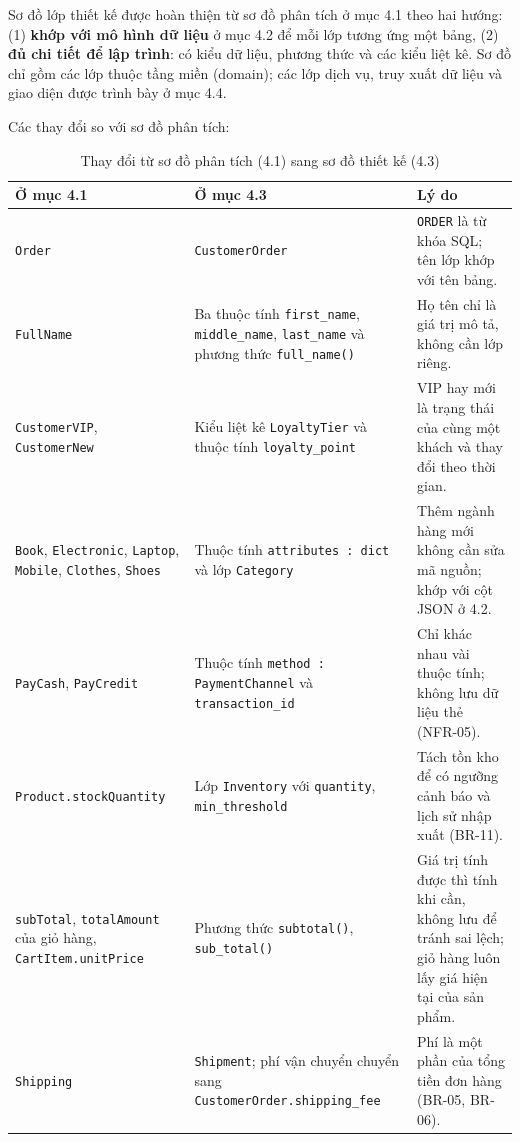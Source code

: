 \documentclass[12pt,a4paper,oneside]{report}
\begin{document}
Sơ đồ lớp thiết kế được hoàn thiện từ sơ đồ phân tích ở mục 4.1 theo hai hướng: (1) \textbf{khớp với mô hình dữ liệu} ở mục 4.2 để mỗi lớp tương ứng một bảng, (2) \textbf{đủ chi tiết để lập trình}: có kiểu dữ liệu, phương thức và các kiểu liệt kê. Sơ đồ chỉ gồm các lớp thuộc tầng miền (domain); các lớp dịch vụ, truy xuất dữ liệu và giao diện được trình bày ở mục 4.4.

Các thay đổi so với sơ đồ phân tích:

\begin{longtable}{p{4.2cm}p{4.6cm}p{6.6cm}}
\caption{Thay đổi từ sơ đồ phân tích (4.1) sang sơ đồ thiết kế (4.3)}\\
\toprule
\textbf{Ở mục 4.1} & \textbf{Ở mục 4.3} & \textbf{Lý do} \\
\midrule
\endhead
\bottomrule
\endlastfoot
\texttt{Order} & \texttt{CustomerOrder} & \texttt{ORDER} là từ khóa SQL; tên lớp khớp với tên bảng. \\
\texttt{FullName} & Ba thuộc tính \texttt{first\_name}, \texttt{middle\_name}, \texttt{last\_name} và phương thức \texttt{full\_name()} & Họ tên chỉ là giá trị mô tả, không cần lớp riêng. \\
\texttt{CustomerVIP}, \texttt{CustomerNew} & Kiểu liệt kê \texttt{LoyaltyTier} và thuộc tính \texttt{loyalty\_point} & VIP hay mới là trạng thái của cùng một khách và thay đổi theo thời gian. \\
\texttt{Book}, \texttt{Electronic}, \texttt{Laptop}, \texttt{Mobile}, \texttt{Clothes}, \texttt{Shoes} & Thuộc tính \texttt{attributes : dict} và lớp \texttt{Category} & Thêm ngành hàng mới không cần sửa mã nguồn; khớp với cột JSON ở 4.2. \\
\texttt{PayCash}, \texttt{PayCredit} & Thuộc tính \texttt{method : PaymentChannel} và \texttt{transaction\_id} & Chỉ khác nhau vài thuộc tính; không lưu dữ liệu thẻ (NFR-05). \\
\texttt{Product.stockQuantity} & Lớp \texttt{Inventory} với \texttt{quantity}, \texttt{min\_threshold} & Tách tồn kho để có ngưỡng cảnh báo và lịch sử nhập xuất (BR-11). \\
\texttt{subTotal}, \texttt{totalAmount} của giỏ hàng, \texttt{CartItem.unitPrice} & Phương thức \texttt{subtotal()}, \texttt{sub\_total()} & Giá trị tính được thì tính khi cần, không lưu để tránh sai lệch; giỏ hàng luôn lấy giá hiện tại của sản phẩm. \\
\texttt{Shipping} & \texttt{Shipment}; phí vận chuyển chuyển sang \texttt{CustomerOrder.shipping\_fee} & Phí là một phần của tổng tiền đơn hàng (BR-05, BR-06). \\

\end{longtable}
\end{document}
